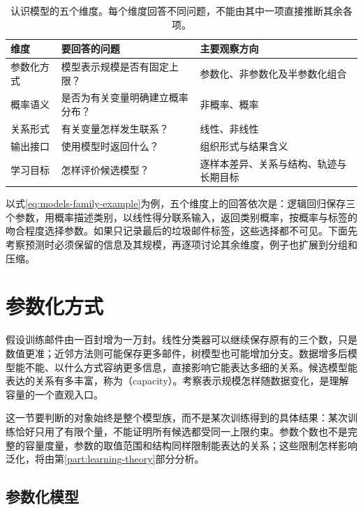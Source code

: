 \begin{table}[htbp]
  \centering
  \small
  \begin{tabularx}{\linewidth}{@{}lXX@{}}
    \toprule
    \textbf{维度} & \textbf{要回答的问题} & \textbf{主要观察方向} \\
    \midrule
参数化方式 & 模型表示规模是否有固定上限？ & 参数化、非参数化及半参数化组合 \\
    概率语义 & 是否为有关变量明确建立概率分布？ & 非概率、概率 \\
    关系形式 & 有关变量怎样发生联系？ & 线性、非线性 \\
    输出接口 & 使用模型时返回什么？ & 组织形式与结果含义 \\
    学习目标 & 怎样评价候选模型？ & 逐样本差异、关系与结构、轨迹与长期目标 \\
    \bottomrule
  \end{tabularx}
  \caption{认识模型的五个维度。每个维度回答不同问题，不能由其中一项直接推断其余各项。}
  \label{tab:models-dimensions}
\end{table}

以式\eqref{eq:models-family-example}为例，五个维度上的回答依次是：逻辑回归保存三个参数，用概率描述类别，以线性得分联系输入，返回类别概率，按概率与标签的吻合程度选择参数。如果只记录最后的垃圾邮件标签，这些选择都不可见。下面先考察预测时必须保留的信息及其规模，再逐项讨论其余维度，例子也扩展到分组和压缩。

\section{参数化方式}
\label{sec:models-capacity}

假设训练邮件由一百封增为一万封。线性分类器可以继续保存原有的三个数，只是数值更准；近邻方法则可能保存更多邮件，树模型也可能增加分支。数据增多后模型能不能、以什么方式容纳更多信息，直接影响它能表达多细的关系。候选模型能表达的关系有多丰富，称为（capacity）。考察表示规模怎样随数据变化，是理解容量的一个直观入口。

这一节要判断的对象始终是整个模型族，而不是某次训练得到的具体结果：某次训练恰好只用了有限个量，不能证明所有候选都受同一上限约束。参数个数也不是完整的容量度量，参数的取值范围和结构同样限制能表达的关系；这些限制怎样影响泛化，将由第\ref{part:learning-theory}部分分析。

\subsection{参数化模型}
\label{sec:models-parametric}

